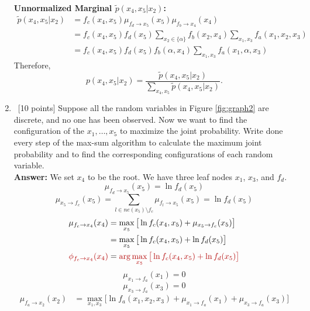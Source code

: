 \documentclass[12pt, fullpage,letterpaper]{article}
\def\red{\color{black!30!red}}
\def\blackblue{\color{black!40!blue}}
\begin{document}
\begin{enumerate}
{{\bf Unnormalized Marginal $\tilde{p}(x_4,x_5|x_2)$:}
\begin{align*}
\tilde{p}(x_4,x_5|x_2) 
& = f_c(x_4,x_5)\mu_{f_d\rightarrow x_5}(x_5)\mu_{f_b\rightarrow x_4}(x_4)\\
& = f_c(x_4,x_5)f_d(x_5) \sum_{x_2\in\{\alpha\}}f_b(x_2,x_4)\sum_{x_1,x_3}f_a(x_1,x_2,x_3)\\
& = f_c(x_4,x_5)f_d(x_5) f_b(\alpha,x_4)\sum_{x_1,x_3}f_a(x_1,\alpha,x_3)
\end{align*}
Therefore,  
$$p(x_4,x_5|x_2) = \frac{\tilde{p}(x_4,x_5|x_2)}{\sum\limits_{x_4,x_5}\tilde{p}(x_4,x_5|x_2)}.$$
}


\item~[10 points] Suppose all the random variables in Figure \ref{fig:graph2} are discrete, and no one has been observed. Now we want to find the configuration of the $x_1, \ldots, x_5$ to maximize the joint probability. Write done every step of the max-sum algorithm to calculate the maximum joint probability and to find the corresponding configurations of each random variable. \\
{\bf \red Answer: }{\blackblue 
We set $x_4$ to be the root. We have three leaf nodes $x_1$, $x_3$, and $f_d$. 
\begin{equation}
\mu_{f_d\rightarrow x_5}(x_5) =\ln f_d(x_5)
\end{equation}
\begin{equation}
\mu_{x_5\rightarrow f_c}(x_5) = \sum_{l\in ne(x_5)\setminus f_c}\mu_{f_l\rightarrow x_5}(x_5) = \ln f_d(x_5)
\end{equation}
\begin{align}
\mu_{f_c\rightarrow x_4}(x_4) & = \max_{x_5}\big[\ln f_c(x_4,x_5) + \mu_{x_5\rightarrow f_c}(x_5)\big]\nonumber \\
& = \max_{x_5}\big[\ln f_c(x_4,x_5) +  \ln f_d(x_5)\big]\label{fcx4}\\
{\red \phi_{f_c\rightarrow x_4}(x_4)} & = {\red \arg\max_{x_5}\big[\ln f_c(x_4,x_5) +  \ln f_d(x_5)\big]}\label{phicx4}
\end{align}
\begin{equation}
\mu_{x_1\rightarrow f_a}(x_1) = 0
\end{equation}
\begin{equation}
\mu_{x_3\rightarrow f_a}(x_3) = 0
\end{equation}
\begin{align}
\mu_{f_a\rightarrow x_2}(x_2) & =  \max_{x_1,x_3}\big[\ln f_a(x_1,x_2,x_3)+ \mu_{x_1\rightarrow f_a}(x_1)+ \mu_{x_3\rightarrow f_a}(x_3)\big] \nonumber \\

\end{align}}
\end{enumerate}
\end{document}
